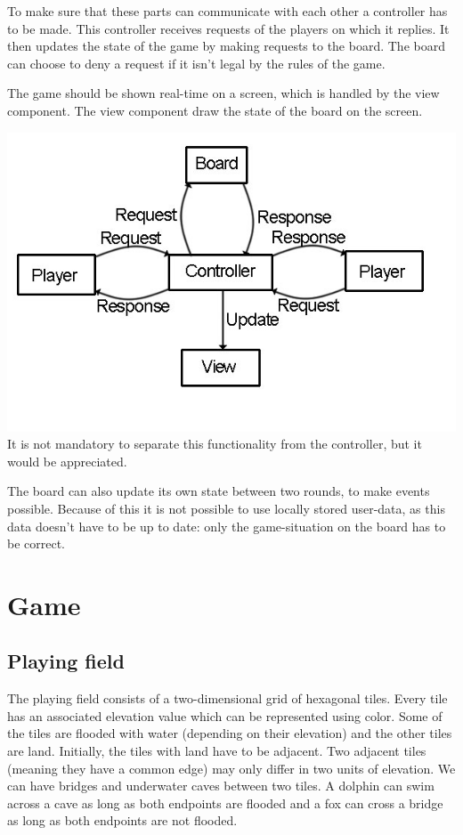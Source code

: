 \documentclass[12pt]{article}
\begin{document}
To make sure that these parts can communicate with each other a controller has to be made. This controller receives requests of the players on which it replies.
It then updates the state of the game by making requests to the board. The board can choose to deny a request if it isn't legal by the rules of the game.

The game should be shown real-time on a screen, which is handled by the view component.
The view component draw the state of the board on the screen.

\includegraphics{plaatje-2a}
It is not mandatory to separate this functionality from the controller,
but it would be appreciated.

The board can also update its own state between two rounds, to make events possible.
Because of this it is not possible to use locally stored user-data, as this data
doesn't have to be up to date: only the game-situation on the board has to be correct.

\section{Game}

\subsection{Playing field}

The playing field consists of a two-dimensional grid of hexagonal tiles. Every tile has an associated elevation value which can be represented using color. Some of the tiles are flooded with water (depending on their elevation) and the other tiles are land. Initially, the tiles with land have to be adjacent. Two adjacent tiles (meaning they have a common edge) may only differ in two units of elevation. We can have bridges and underwater caves between two tiles. A dolphin can swim across a cave as long as both endpoints are flooded and a fox can cross a bridge as long as both endpoints are not flooded.
\end{document}

